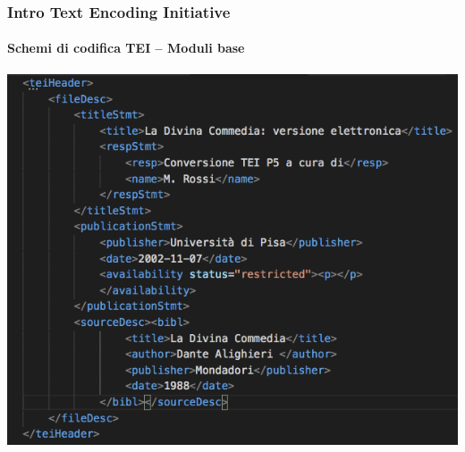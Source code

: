 



\begin{frame}
	\frametitle{Intro Text Encoding Initiative}
	\framesubtitle{Schemi di codifica TEI – Moduli base}
	\addtocounter{nframe}{1}

	\begin{center}
		\includegraphics[width=.8\textwidth]{imgs/header2.png}
	\end{center}
	

\end{frame}




